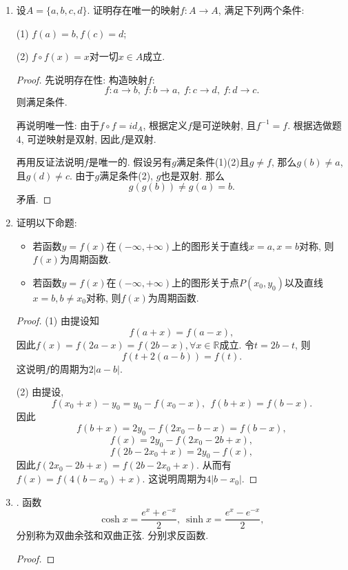 \documentclass[UTF8,11pt, a4paper, oneside, fontset=none]{ctexbook}
\begin{document}
\begin{enumerate}
\item 设$A = \{ a, b, c, d\}$. 证明存在唯一的映射$f : A \to A$, 满足下列两个条件:

(1) $f(a) = b, f(c) = d$;

(2) $f \circ f(x) = x$对一切$x \in A$成立.


\begin{proof}

先说明存在性: 构造映射$f$:
\[
f : a \to b, \ f : b \to a, \ f : c \to d, \ f : d \to c.
\]
则满足条件. 

再说明唯一性: 由于$f \circ f = id_A$, 根据定义$f$是可逆映射, 且$f^{-1} = f$. 根据选做题4, 可逆映射是双射, 因此$f$是双射. 


再用反证法说明$f$是唯一的. 假设另有$g$满足条件(1)(2)且$g \neq f$, 那么$g (b) \neq a$, 且$g (d) \neq c$. 由于$g$满足条件(2), $g$也是双射. 那么
\[
g(g(b)) \neq g(a) = b. 
\]
矛盾.


\end{proof}


\item 证明以下命题:
\begin{itemize}
\item[(1)] 若函数$y = f(x) $在$(- \infty, + \infty)$上的图形关于直线$x =a, x=b$对称, 则$f(x)$为周期函数.
\item[(2)] 若函数$y = f(x) $在$(- \infty, + \infty)$上的图形关于点$P(x_0, y_0)$以及直线$x =b, b \neq x_0$对称, 则$f(x)$为周期函数.
\end{itemize}


\begin{proof}


(1) 由提设知
\[
f(a+x) = f(a-x),
\]
因此$f(x) = f(2a-x) = f(2b-x), \forall x \in \mathbb R$成立. 令$t = 2b-t$, 则
\[
f(t + 2(a-b)) = f(t).
\]
这说明$f$的周期为$2 |a-b|$.


(2) 由提设, 
\[
f(x_0 + x) - y_0 = y_0 - f(x_0 -x), \ \ f(b + x ) = f(b-x).
\]
因此
\[
f(b+x) = 2y_0 - f(2x_0 -b-x) = f(b-x),
\]
\[
f(x) = 2y_0 - f(2x_0 -2b+x), 
\]
\[
f(2b - 2x_0 +x) = 2y_0 - f(x),
\]
因此$f(2x_0 - 2b+ x) = f(2b - 2x_0 +x)$. 从而有$f(x) = f(4(b-x_0) +x)$. 这说明周期为$4|b - x_0|$.

\end{proof}


\item. 函数
\[
\cosh x = \frac{e^x + e^{-x}}{2}, \ \sinh x = \frac{e^x - e^{-x}}{2},
\]
分别称为双曲余弦和双曲正弦. 分别求反函数.


\begin{proof}


\end{proof}
\end{enumerate}
\end{document}
